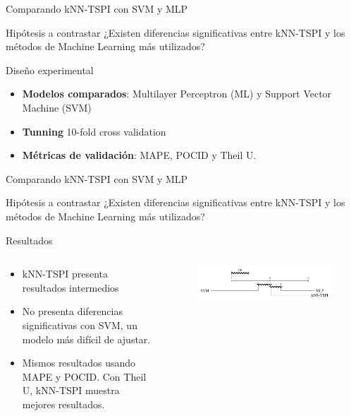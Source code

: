 \documentclass[12pt, aspectratio=169]{beamer} %
\begin{document}
\begin{frame}{Comparando kNN-TSPI con SVM y MLP}

  \begin{block}{Hipótesis a contrastar}
    ¿Existen diferencias significativas entre kNN-TSPI y los métodos de Machine Learning más utilizados?
  \end{block}

  \begin{block}{Diseño experimental}
    \begin{itemize}
    \item \textbf{Modelos comparados}: Multilayer Perceptron (ML) y Support Vector Machine (SVM)
    \item \textbf{Tunning} 10-fold cross validation
    \item \textbf{Métricas de validación}: MAPE, POCID y Theil U.
    \end{itemize}
  \end{block}
  
\end{frame}

\begin{frame}{Comparando kNN-TSPI con SVM y MLP}

  \begin{block}{Hipótesis a contrastar}
    ¿Existen diferencias significativas entre kNN-TSPI y los métodos de Machine Learning más utilizados?
  \end{block}

  \begin{block}{Resultados}
    \begin{columns}
      \begin{column}{0.6\textwidth}
        \begin{itemize}
        \item kNN-TSPI presenta resultados intermedios
        \item No presenta diferencias significativas con SVM, un modelo más difícil de ajustar.
        \item Mismos resultados usando MAPE y POCID. Con Theil U, kNN-TSPI muestra mejores resultados.
        \end{itemize}
      \end{column}
      \begin{column}{0.4\textwidth}
        \begin{figure}
          \includegraphics[width=\textwidth]{20210314_1_nemnyi_distancias_tecnicas_cd.png}
        \end{figure}
      \end{column}
      \end{columns}
  \end{block}
\end{frame}
\end{document}
